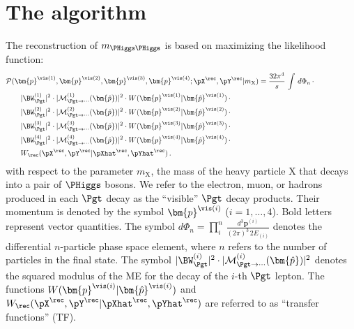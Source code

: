 \section{The algorithm}
\label{sec:algorithm}

The reconstruction of $m_{\PHiggs\PHiggs}$ is based on maximizing the likelihood function:
\begin{align}
&
\mathcal{P}(\bm{p}^{\vis(1)},\bm{p}^{\vis(2)},\bm{p}^{\vis(3)},\bm{p}^{\vis(4)};\pX^{\rec},\pY^{\rec}|m_{\textrm{X}})
= \frac{32\pi^{4}}{s} \, \int \, d\Phi_{n} \, \cdot \hspace{2cm} \nonumber \\
& \qquad \vert \BW^{(1)}_{\Pgt} \vert^{2} \cdot \vert \mathcal{M}^{(1)}_{\Pgt\to\cdots}(\bm{\hat{p}}) \vert^{2} \cdot W(\bm{p}^{\vis(1)}|\bm{\hat{p}}^{\vis(1)}) \, \cdot \nonumber \\
& \qquad \vert \BW^{(2)}_{\Pgt} \vert^{2} \cdot \vert \mathcal{M}^{(2)}_{\Pgt\to\cdots}(\bm{\hat{p}}) \vert^{2} \cdot W(\bm{p}^{\vis(2)}|\bm{\hat{p}}^{\vis(2)}) \, \cdot \nonumber \\
& \qquad \vert \BW^{(3)}_{\Pgt} \vert^{2} \cdot \vert \mathcal{M}^{(3)}_{\Pgt\to\cdots}(\bm{\hat{p}}) \vert^{2} \cdot W(\bm{p}^{\vis(3)}|\bm{\hat{p}}^{\vis(3)}) \, \cdot \nonumber \\
& \qquad \vert \BW^{(4)}_{\Pgt} \vert^{2} \cdot \vert \mathcal{M}^{(4)}_{\Pgt\to\cdots}(\bm{\hat{p}}) \vert^{2} \cdot W(\bm{p}^{\vis(4)}|\bm{\hat{p}}^{\vis(4)}) \, \cdot \nonumber \\
& \qquad W_{\rec}( \pX^{\rec},\pY^{\rec} | \pXhat^{\rec},\pYhat^{\rec} ) \, .
\label{eq:likelihood_with_hadRecoil}
\end{align}
with respect to the parameter $m_{\textrm{X}}$, 
the mass of the heavy particle $\textrm{X}$ that decays into a pair of $\PHiggs$ bosons.
We refer to the electron, muon, or hadrons produced in each $\Pgt$ decay as the ``visible'' $\Pgt$ decay products.
Their momentum is denoted by the symbol $\bm{p}^{\vis(i)}$ ($i = 1,\ldots,4$).
Bold letters represent vector quantities.
The symbol $d\Phi_{n} = \prod_{i}^{n} \,
\frac{d^{3}\bm{p}^{(i)}}{(2\pi)^{3} \, 2 E_{(i)}}$ denotes the differential $n$-particle phase space element,
where $n$ refers to the number of particles in the final state.
The symbol $\vert \BW^{(i)}_{\Pgt} \vert^{2} \cdot \vert \mathcal{M}^{(i)}_{\Pgt\to\cdots}(\bm{\hat{p}}) \vert^{2}$ 
denotes the squared modulus of the ME for the decay of the $i$-th $\Pgt$ lepton.
The functions $W(\bm{p}^{\vis(i)}|\bm{\hat{p}}^{\vis(i)})$ and $W_{\rec}( \pX^{\rec},\pY^{\rec} | \pXhat^{\rec},\pYhat^{\rec} )$ are referred to as ``transfer functions'' (TF).
